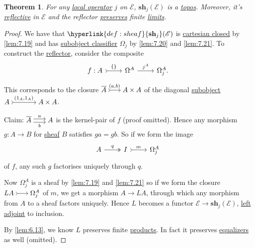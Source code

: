 \documentclass{article}
\newcommand{\sh}{\mathbf{sh}}
\newenvironment{tikzcdi}{\begin{tikzcd}[cramped, sep=scriptsize]}{\end{tikzcd}}
\newtheorem{nthm}{Theorem}[section]
\begin{document}
\begin{nthm}\label{thm:7.22}
  For any \hyperlink{def:lop}{local operator} $j$ on $\mathscr{E}$, $\sh_j(\mathscr{E})$ is a \hyperlink{def:topos}{topos}.
  Moreover, it's \hyperlink{def:refl}{reflective} in $\mathscr{E}$ and the reflector \hyperlink{def:plim}{preserves} finite \hyperlink{def:limit}{limits}.
\end{nthm}
\begin{proof}
  We have that $\hyperlink{def:sheaf}{\sh_j}(\mathscr{E})$ is \hyperlink{def:cc}{cartesian closed} by \cref{lem:7.19} and has \hyperlink{def:sc}{subobject classifier} $\Omega_j$ by \cref{lem:7.20} and \cref{lem:7.21}.
  To construct the \hyperlink{def:refl}{reflector}, consider the composite
  \begin{equation*}
    \begin{tikzcd}
      f: A \rar[tail]{\{\}} & \Omega^A \rar{j^A} &\Omega_j^A.
    \end{tikzcd}
  \end{equation*}
  This corresponds to the closure $\begin{tikzcdi}\overline{A} \rar[tail]{(a,b)} & A \times A\end{tikzcdi}$ of the diagonal \hyperlink{def:subobj}{subobject} $\begin{tikzcd}[cramped, row sep=scriptsize, column sep=large]A \rar[tail]{(1_A, 1_A)} & A \times A\end{tikzcd}$.

  Claim: $\begin{tikzcdi}\overline{A} \rar[shift left]{a} \rar[shift right,']{b} & A\end{tikzcdi}$ is the kernel-pair of $f$ (proof omitted).
  Hence any morphism $g: A \to B$ for \hyperlink{def:sheaf}{sheaf} $B$ satisfies $ga = gb$.
  So if we form the image
  \begin{equation*}
    \begin{tikzcd}
      A \rar[two heads]{q} & I \rar[tail]{m} & \Omega_j^A
    \end{tikzcd}
  \end{equation*}
  of $f$, any such $g$ factorises uniquely through $q$.

  Now $\Omega_j^A$ is a sheaf by \cref{lem:7.19} and \cref{lem:7.21} so if we form the closure $\begin{tikzcdi} LA \rar[tail] & \Omega_j^A \end{tikzcdi}$ of $m$, we get a morphism $A \to LA$, through which any morphism from $A$ to a sheaf factors uniquely.
  Hence $L$ becomes a functor $\mathscr{E} \to \sh_j(\mathscr{E})$, \hyperlink{def:adj}{left adjoint} to inclusion.

  By \cref{lem:6.13}, we know $L$ preserves finite \hyperlink{def:lprod}{products}.
  In fact it preserves \hyperlink{def:equalizer}{equalizers} as well (omitted).
\end{proof}
\end{document}
